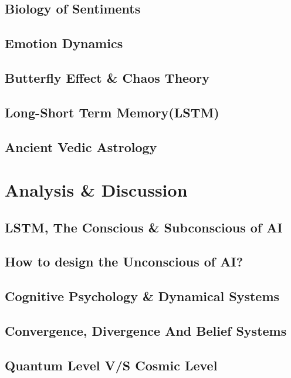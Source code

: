 \documentclass[12pt, a4paper]{article}
\begin{document}
\begin{multicols}{2}
		\subsection{Biology of Sentiments}
		
		\subsection{Emotion Dynamics}
		
		\subsection{Butterfly Effect \& Chaos Theory}
		
		\subsection{Long-Short Term Memory(LSTM)}
		
		\subsection{Ancient Vedic Astrology}
		
		\section{Analysis \& Discussion}
		\subsection{LSTM, The Conscious \& Subconscious of AI}
		\subsection{How to design the Unconscious of AI?}
		\subsection{Cognitive Psychology \& Dynamical Systems}
		
		\subsection{Convergence, Divergence And Belief Systems}
		
		\subsection{Quantum Level V/S Cosmic Level}
		

\end{multicols}
\end{document}
